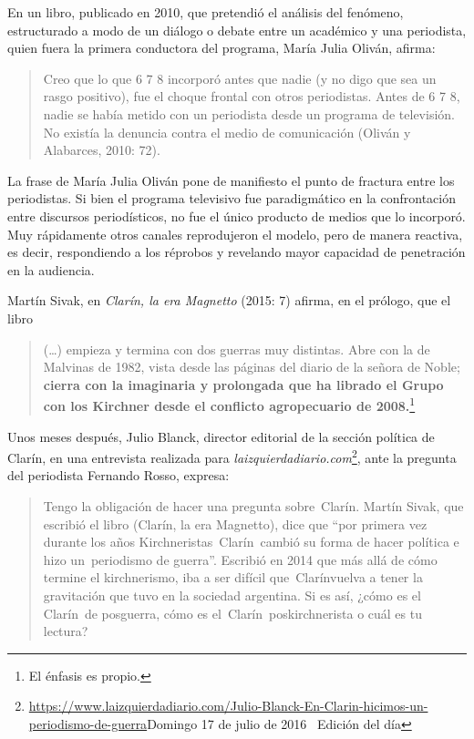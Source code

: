 En un libro, publicado en 2010, que pretendió el análisis del fenómeno, estructurado a modo de un diálogo o debate entre un académico y una periodista, quien fuera la primera conductora del programa, María Julia Oliván, afirma:

\begin{quote}
Creo que lo que 6 7 8 incorporó antes que nadie (y no digo que sea un rasgo positivo), fue el choque frontal con otros periodistas. Antes de 6 7 8, nadie se había metido con un periodista desde un programa de televisión. No existía la denuncia contra el medio de comunicación (Oliván y Alabarces, 2010: 72).
\end{quote}

La frase de María Julia Oliván pone de manifiesto el punto de fractura entre los periodistas. Si bien el programa televisivo fue paradigmático en la confrontación entre discursos periodísticos, no fue el único producto de medios que lo incorporó. Muy rápidamente otros canales reprodujeron el modelo, pero de manera reactiva, es decir, respondiendo a los réprobos y revelando mayor capacidad de penetración en la audiencia.

Martín Sivak, en \emph{Clarín, la era Magnetto} (2015: 7) afirma, en el prólogo, que el libro

\begin{quote}
(\ldots) empieza y termina con dos guerras muy distintas. Abre con la de Malvinas de 1982, vista desde las páginas del diario de la señora de Noble; \textbf{cierra con la imaginaria y prolongada que ha librado el Grupo con los Kirchner desde el conflicto agropecuario de 2008.}\footnote{El énfasis es propio.}
\end{quote}

Unos meses después, Julio Blanck, director editorial de la sección política de Clarín, en una entrevista realizada para \emph{laizquierdadiario.com}\footnote{\url{https://www.laizquierdadiario.com/Julio-Blanck-En-Clarin-hicimos-un-periodismo-de-guerra}Domingo 17 de julio de 2016~\textbar{} Edición del día}, ante la pregunta del periodista Fernando Rosso, expresa:

\begin{quote}
Tengo la obligación de hacer una pregunta sobre~Clarín. Martín Sivak, que escribió el libro (Clarín, la era Magnetto), dice que \enquote{por primera vez durante los años Kirchneristas~Clarín~cambió su forma de hacer política e hizo un~periodismo de guerra}. Escribió en 2014 que más allá de cómo termine el kirchnerismo, iba a ser difícil que~Clarínvuelva  a tener la gravitación que tuvo en la sociedad argentina. Si es así, ¿cómo es el Clarín~de posguerra, cómo es el~Clarín~poskirchnerista o cuál es tu lectura?
\end{quote}

